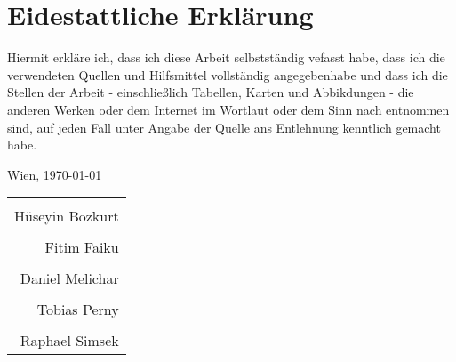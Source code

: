\section*{Eidestattliche Erklärung}

Hiermit erkläre ich, dass ich diese Arbeit selbstständig vefasst habe, dass ich die verwendeten Quellen und Hilfsmittel vollständig angegebenhabe und dass ich die Stellen der Arbeit - einschließlich Tabellen, Karten und Abbikdungen - die anderen Werken oder dem Internet im Wortlaut oder dem Sinn nach entnommen sind, auf jeden Fall unter Angabe der Quelle ans Entlehnung kenntlich gemacht habe.

\vspace{0.5cm}

Wien, \today

\vspace{1.5cm}

\begin{flushright}
	\begin{tabular}{r}
	 \makebox[2.5in]{\hrulefill}\\
	 Hüseyin Bozkurt\\[8ex]
	 \makebox[2.5in]{\hrulefill}\\
	 Fitim Faiku\\[8ex]
	 \makebox[2.5in]{\hrulefill}\\
	 Daniel Melichar\\[8ex]
	 \makebox[2.5in]{\hrulefill}\\
	 Tobias Perny\\[8ex]
	 \makebox[2.5in]{\hrulefill}\\
	 Raphael Simsek\\[8ex]
	\end{tabular}
\end{flushright}